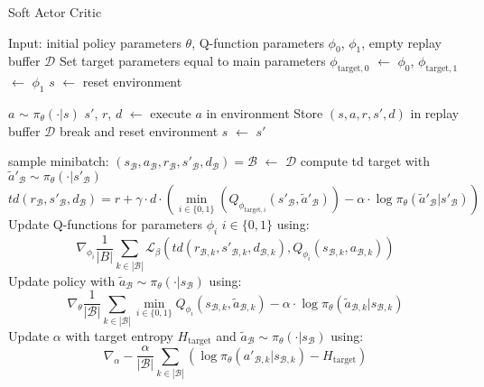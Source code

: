 \begin{algorithm}[p]
\caption{Soft Actor Critic}
\label{alg:SAC}
\begin{algorithmic}
    \State Input: initial policy parameters $\theta$, Q-function parameters $\phi_0$, $\phi_1$, empty replay buffer $\mathcal{D}$
        \State Set target parameters equal to main parameters $\phi_{\text{target}, 0}$ $\leftarrow$ $\phi_0$, $\phi_{\text{target}, 1}$ $\leftarrow$ $\phi_1$ 
        \State $s$ $\leftarrow$ reset environment
        
        \State $a$ $\sim$ $\pi_\theta(\cdot | s)$
        \State $s'$, $r$, $d$ $\leftarrow$ execute $a$ in environment
        \State Store $(s, a, r, s', d)$ in replay buffer $\mathcal{D}$
        \State break and reset environment
        \EndIf
        \State $s$ $\leftarrow$ $s'$
        \EndFor
        
        \State sample minibatch: $(s_\mathcal{B}, a_\mathcal{B}, r_\mathcal{B}, s'_\mathcal{B}, d_\mathcal{B}) = \mathcal{B}$ $\leftarrow$ $\mathcal{D}$ 
        \State compute td target with $\tilde{a}'_\mathcal{B} \sim \pi_\theta(\cdot|s'_\mathcal{B})$
        \begin{equation*}
            td(r_\mathcal{B}, s'_\mathcal{B}, d_\mathcal{B}) = r + \gamma \cdot d \cdot \left(\min_{i\in\{0, 1\}}\left(Q_{\phi_{\text{target}, i}}(s'_\mathcal{B}, \tilde{a}'_\mathcal{B})\right) - \alpha \cdot \log \pi_\theta(\tilde{a}'_\mathcal{B}|s'_\mathcal{B})\right)
        \end{equation*}
        \State Update Q-functions for parameters $\phi_i$ $i \in \{0, 1\}$ using:
        \begin{equation*}
            \nabla_{\phi_i} \frac{1}{|B|} \sum_{k \in |\mathcal{B}|}\mathcal{L}_\beta\left(td(r_{\mathcal{B}, k}, s'_{\mathcal{B}, k}, d_{\mathcal{B}, k}), Q_{\phi_i}(s_{\mathcal{B}, k}, a_{\mathcal{B}, k})\right)    
        \end{equation*}
        \State Update policy with $\tilde{a}_\mathcal{B} \sim \pi_\theta(\cdot|s_\mathcal{B})$ using:
        \begin{equation*}
           \nabla_{\theta} \frac{1}{|\mathcal{B}|}\sum_{k \in |\mathcal{B}|}\min_{i\in\{0, 1\}}Q_{\phi_i}(s_{\mathcal{B}, k}, \tilde{a}_{\mathcal{B}, k}) - \alpha \cdot \log \pi_\theta(\tilde{a}_{\mathcal{B}, k}|s_{\mathcal{B}, k})
        \end{equation*}
        \State Update $\alpha$ with target entropy $H_\text{target}$ and $\tilde{a}_\mathcal{B} \sim \pi_\theta(\cdot|s_\mathcal{B})$ using:
        \begin{equation*}
            \nabla_\alpha -\frac{\alpha}{|\mathcal{B}|} \sum_{k \in |\mathcal{B}|} \left(\log \pi_\theta(a'_{\mathcal{B}, k}|s_{\mathcal{B}, k}) - H_\text{target}\right)
        \end{equation*}
        \EndFor
        \EndIf
        \EndFor
\end{algorithmic}
\end{algorithm}